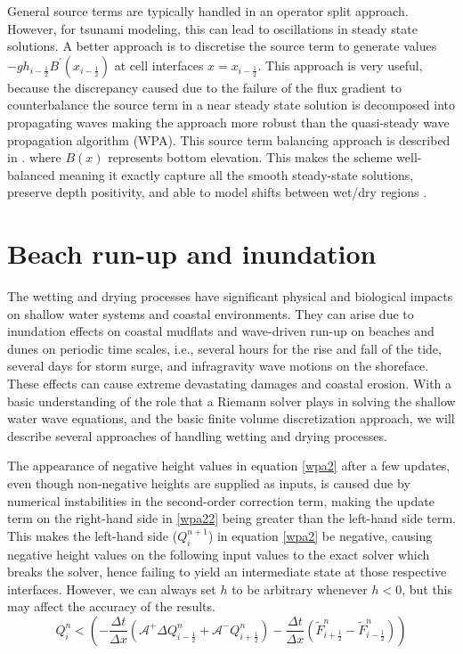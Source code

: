 \documentclass[10pt,a4paper]{article}
\begin{document}
	General source terms are typically handled in an operator split approach.  However, for tsunami modeling, this can lead to oscillations in steady state solutions.  A better approach is to discretise the source term to generate values $-gh_{i-\frac{1}{2}}B^{\prime}(x_{i-\frac{1}{2}})$ at  cell interfaces  $x = x_{i-\frac{1}{2}}$. This approach is very useful, because the discrepancy caused due to the failure of the flux gradient to counterbalance the source term in a near steady state solution is decomposed into propagating waves  making the approach more robust than the quasi-steady wave propagation algorithm (WPA).  This source term balancing approach is described in \cite{ba-le-mi-ro:2003,chaabelasri1849simple}.
	where $B(x)$ represents bottom elevation. This makes the scheme well-balanced  meaning it exactly capture all the smooth steady-state solutions, preserve depth positivity, and able to model shifts between wet/dry regions \cite{ba-le-mi-ro:2003}.


\section{Beach run-up and inundation}
The wetting and drying processes have significant physical and biological impacts on shallow water systems and coastal environments. They can arise due to inundation effects on coastal mudflats and wave-driven run-up on beaches and dunes on periodic time scales, i.e., several hours for the rise and fall of the tide, several days for storm surge, and infragravity wave motions on the shoreface.  These effects can cause extreme devastating damages and coastal erosion.
	With a basic understanding of the role that a Riemann solver plays in solving the shallow water wave equations, and the basic finite volume discretization approach, we will describe several approaches of handling wetting and drying processes.  

The appearance of negative height values in equation \eqref{wpa2} after a few updates, even though non-negative heights are supplied as inputs, is caused due by numerical instabilities in the second-order correction term, making the update term on the right-hand side in \eqref{wpa22} being greater than the left-hand side term. This makes the left-hand side ($  Q_{i}^{n+1}  $) in equation \eqref{wpa2} be negative, causing negative height values on the following input values to the exact solver which breaks the solver, hence failing to yield an intermediate state at those respective interfaces. However, we can always set $h$ to be arbitrary whenever $h<0$, but this may affect the accuracy of the results.
\begin{equation}
	Q_{i}^{n} < \left(- \frac{\Delta t}{\Delta x}(\mathcal{A^{+}}\Delta 	Q_{i-\frac{1}{2}}^{n} + \mathcal{A^{-}}Q_{i+\frac{1}{2}}^{n}) - \frac{\Delta t}{\Delta x} (\tilde{F}_{i+\frac{1}{2}}^{n} - \tilde{F}_{i-\frac{1}{2}}^{n} )\right)
	\label{wpa22}
\end{equation}
\end{document}
